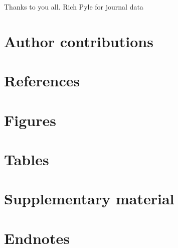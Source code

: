\documentclass[
]{article}
\begin{document}
Thanks to you all. Rich Pyle for journal data

\hypertarget{author-contributions}{%
\section{Author contributions}\label{author-contributions}}

\hypertarget{references}{%
\section{References}\label{references}}

\hypertarget{figures}{%
\section{Figures}\label{figures}}

\hypertarget{tables}{%
\section{Tables}\label{tables}}

\hypertarget{supplementary-material}{%
\section{Supplementary material}\label{supplementary-material}}

\hypertarget{endnotes}{%
\section*{Endnotes}\label{endnotes}}
\end{document}
